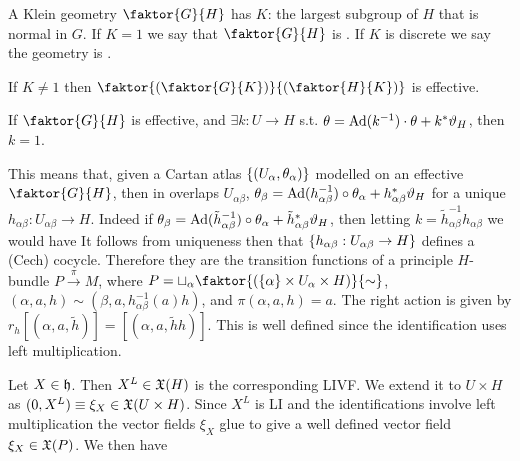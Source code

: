 \documentclass{article}
\begin{document}
\begin{definition}
A Klein geometry $\faktor{G}{H}$ has  $K$: the largest subgroup of $H$ that is normal in $G$. If $K=1$ we say that $\faktor{G}{H}$ is . If $K$ is discrete we say the geometry is .
\end{definition}

\begin{lemma}
If $K \neq 1$ then $\faktor{{(\faktor{G}{K})}}{{(\faktor{H}{K})}}$ is effective. 
\end{lemma}

\begin{prop}
If $\faktor{G}{H}$ is effective, and $\exists k:U \to H$ s.t. $\theta = \operatorname{Ad}(k^{-1})\cdot \theta + k^\ast \vartheta_H$, then $k=1$. 
\end{prop}

This means that, given a Cartan atlas $\left\{ (U_\alpha,\theta_\alpha) \right\}$ modelled on an effective $\faktor{G}{H}$, then in overlaps $U_{\alpha\beta}$, $\theta_\beta = \operatorname{Ad}(h_{\alpha\beta}^{-1}) \circ \theta_\alpha + h_{\alpha\beta}^\ast \vartheta_H$ for a unique $h_{\alpha\beta}:U_{\alpha\beta} \to H$. Indeed if $\theta_\beta = \operatorname{Ad}(\tilde{h}_{\alpha\beta}^{-1}) \circ \theta_\alpha + \tilde{h}_{\alpha\beta}^\ast \vartheta_H$, then letting $k = \tilde{h}_{\alpha\beta}^{-1} h_{\alpha\beta}$ we would have
It follows from uniqueness then that $\left\{ h_{\alpha\beta} : U_{\alpha\beta} \to H \right\}$ defines a (Cech) cocycle. Therefore they are the transition functions of a principle $H$-bundle $P\overset{\pi}{\to} M$, where $P = \sqcup_{\alpha} \faktor{(\pbrace{\alpha}\times U_\alpha \times H)}{\sim}$, $(\alpha,a,h)\sim (\beta,a,h_{\alpha\beta}^{-1}(a)h)$, and $\pi(\alpha,a,h) = a$. The right action is given by $r_h[(\alpha,a,\tilde{h})] = [(\alpha,a,\tilde{h}h)]$. This is well defined since the identification uses left multiplication. 

Let $X \in \mathfrak{h}$. Then $X^L\in\mathfrak{X}(H)$ is the corresponding LIVF. We extend it to $U \times H$ as $(0,X^L) \equiv \xi_X \in\mathfrak{X}(U \times H)$. Since $X^L$ is LI and the identifications involve left multiplication the vector fields $\xi_X$ glue to give a well defined vector field $\xi_X \in \mathfrak{X}(P)$. We then have 
\end{document}
